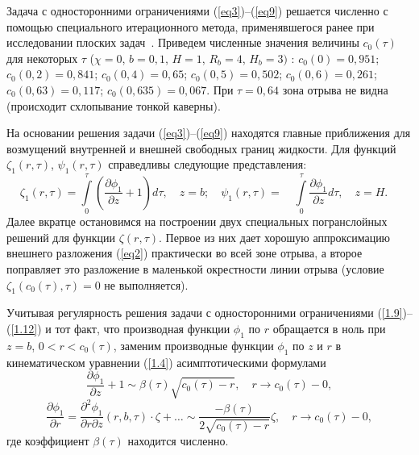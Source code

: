 \documentclass[press]{vestnik}
\begin{document}
Задача с односторонними ограничениями (\ref{eq3})--(\ref{eq9}) решается численно с 
помощью специального итерационного метода, применявшегося ранее при 
исследовании плоских задач~\cite{B02,B03,B04}. Приведем численные значения величины 
$c_{0} (\tau )$ для некоторых $\tau $ ($\chi =0$, $b=0,1$, $H=1$, $R_{b} 
=4$, $H_{b} =3)$ : $c_{0} (0)=0,951$; $c_{0} (0,2)=0,841$; $c_{0} 
(0,4)=0,65$; $c_{0} (0,5)=0,502$; $c_{0} (0,6)=0,261$; $c_{0} (0,63)=0,117$; 
$c_{0} (0,635)=0,067$. При $\tau =0,64$ зона отрыва не видна (происходит 
схлопывание тонкой каверны). 

На основании решения задачи (\ref{eq3})--(\ref{eq9}) находятся главные приближения для 
возмущений внутренней и внешней свободных границ жидкости. Для функций 
$\zeta_{1} (r,\tau )$, $\psi_{1} (r,\tau )$ справедливы следующие 
представления:
\begin{equation}
\label{eq10}
\zeta_{1} (r,\tau )=
\int\limits_0^\tau {\left( {\frac{\partial \phi_{1} }{\partial z}+1} 
\right)} d\tau ,
\quad
z=b;
\quad
\psi_{1} (r,\tau )=
\quad
\int\limits_0^\tau {\frac{\partial \phi_{1} }{\partial z}d\tau } ,
\quad
z=H.
\quad
\end{equation}
Далее вкратце остановимся на построении двух специальных погранслойных 
решений для функции $\zeta (r,\tau )$. Первое из них дает хорошую 
аппроксимацию внешнего разложения (\ref{eq2}) практически во всей зоне отрыва, а 
второе поправляет это разложение в маленькой окрестности линии отрыва 
(условие $\zeta_{1} (c_{0} (\tau ),\tau )=0$ не выполняется).

Учитывая регулярность решения задачи с односторонними ограничениями (\ref{1.9})--(\ref{1.12}) и тот факт, что производная функции $\phi_{1} $ по $r$ обращается в 
ноль при $z=b$, $0<r<c_{0} (\tau )$, заменим производные функции $\phi_{1} $ 
по $z$ и $r$ в кинематическом уравнении (\ref{1.4}) асимптотическими формулами
\begin{equation}
\label{eq11}
\frac{\partial \phi_{1} }{\partial z}+1\sim \beta (\tau )\sqrt {c_{0} (\tau 
)-r} ,
\quad
r\to c_{0} (\tau )-0,
\end{equation}
\[
\frac{\partial \phi_{1} }{\partial r}=\frac{\partial^{2}\phi_{1} 
}{\partial r\partial z}(r,b,\tau )\cdot \zeta +\ldots \sim \frac{-\beta (\tau 
)}{2\sqrt {c_{0} (\tau )-r} }\zeta ,
\quad
r\to c_{0} (\tau )-0,
\]
где коэффициент $\beta (\tau )$ находится численно.
\end{document}

